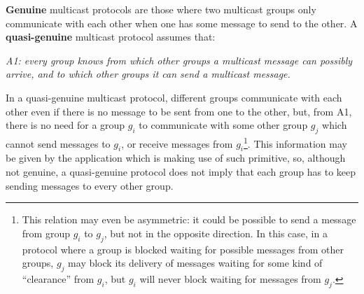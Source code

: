 \documentclass[times, 10pt]{article}
\begin{document}




\textbf{Genuine} multicast protocols are those where two multicast groups only communicate with each other when one has some message to send to the other. A \textbf{quasi-genuine} multicast protocol assumes that: 

\begin{center}
\emph{A1: every group knows from which other groups a multicast message can possibly arrive, and to which other groups it can send a multicast message.}
\end{center}

In a quasi-genuine multicast protocol, different groups communicate with each other even if there is no message to be sent from one to the other, but, from A1, there is no need for a group $g_i$ to communicate with some other group $g_j$ which cannot send messages to $g_i$, or receive messages from $g_i$\footnote{This relation may even be asymmetric: it could be possible to send a message from group $g_i$ to $g_j$, but not in the opposite direction. In this case, in a protocol where a group is blocked waiting for possible messages from other groups, $g_j$ may block its delivery of messages waiting for some kind of ``clearance'' from $g_i$, but $g_i$ will never block waiting for messages from $g_j$.}. This information may be given by the application which is making use of such primitive, so, although not genuine, a quasi-genuine protocol does not imply that each group has to keep sending messages to every other group.
\end{document}
